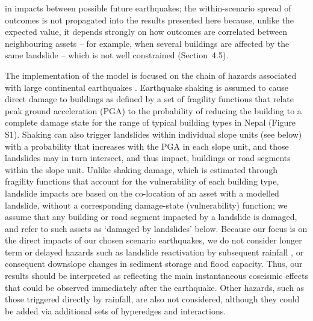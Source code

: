 \documentclass[preprint,12pt,authoryear]{elsarticle}
\begin{document}
in impacts between possible future earthquakes; the within-scenario spread of outcomes is not propagated into the results presented here because, unlike the expected value, it depends strongly on how outcomes are correlated between neighbouring assets -- for example, when several buildings are affected by the same landslide -- which is not well constrained (Section~4.5).

The implementation of the model is focused on the chain of hazards associated with large continental earthquakes \citep{Fan2019}. Earthquake shaking is assumed to cause direct damage to buildings as defined by a set of fragility functions that relate peak ground acceleration (PGA) to the probability of reducing the building to a complete damage state for the range of typical building types in Nepal (Figure S1). Shaking can also trigger landslides within individual slope units (see below) with a probability that increases with the PGA in each slope unit, and those landslides may in turn intersect, and thus impact, buildings or road segments within the slope unit. Unlike shaking damage, which is estimated through fragility functions that account for the vulnerability of each building type, landslide impacts are based on the co-location of an asset with a modelled landslide, without a corresponding damage-state (vulnerability) function; we assume that any building or road segment impacted by a landslide is damaged, and refer to such assets as `damaged by landslides' below. Because our focus is on the direct impacts of our chosen scenario earthquakes, we do not consider longer term or delayed hazards such as landslide reactivation by subsequent rainfall \citep{Fan2019,Kincey2021}, or consequent downslope changes in sediment storage and flood capacity. Thus, our results should be interpreted as reflecting the main instantaneous coseismic effects that could be observed immediately after the earthquake. Other hazards, such as those triggered directly by rainfall, are also not considered, although they could be added via additional sets of hyperedges and interactions.
\end{document}
